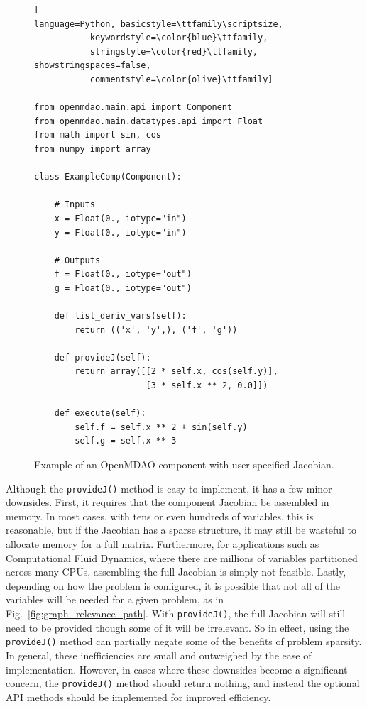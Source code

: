 \documentclass[]{aiaa-tc} %
\begin{document}
\begin{figure}
\begin{minipage}{\textwidth}
\begin{lstlisting}[
language=Python, basicstyle=\ttfamily\scriptsize,
           keywordstyle=\color{blue}\ttfamily,
           stringstyle=\color{red}\ttfamily, showstringspaces=false,
           commentstyle=\color{olive}\ttfamily]

from openmdao.main.api import Component
from openmdao.main.datatypes.api import Float
from math import sin, cos
from numpy import array

class ExampleComp(Component):

    # Inputs
    x = Float(0., iotype="in")
    y = Float(0., iotype="in")

    # Outputs
    f = Float(0., iotype="out")
    g = Float(0., iotype="out")

    def list_deriv_vars(self):
        return (('x', 'y',), ('f', 'g'))

    def provideJ(self):
        return array([[2 * self.x, cos(self.y)],
                      [3 * self.x ** 2, 0.0]])

    def execute(self):
        self.f = self.x ** 2 + sin(self.y)
        self.g = self.x ** 3

\end{lstlisting}
\caption{Example of an OpenMDAO
component with user-specified Jacobian.
\label{fig:code-block-1}}
\end{minipage}

\end{figure}

        Although the \texttt{provideJ()} method is easy to implement, it has a few minor downsides. First,
        it requires that the component Jacobian be assembled in memory. In most cases, with tens or even hundreds of variables,
        this is reasonable, but if the Jacobian has a sparse structure, it may still be wasteful to allocate memory for a
        full matrix. Furthermore, for applications such as Computational Fluid Dynamics, where there are millions of variables partitioned
        across many CPUs, assembling the full Jacobian is simply not feasible. Lastly, depending on how
        the problem is configured, it is possible that not all of the variables will be needed for a given problem, as in Fig.~\ref{fig:graph_relevance_path}.
        With \texttt{provideJ()}, the full Jacobian will still need to be provided though some of it will be irrelevant.
        So in effect, using the \texttt{provideJ()} method can partially negate some of the benefits of problem sparsity.
        In general, these inefficiencies are small and outweighed by the ease of implementation. However, in cases where
        these downsides become a significant concern, the \texttt{provideJ()} method should return nothing, and instead the
        optional API methods should be implemented for improved efficiency.
\end{document}
